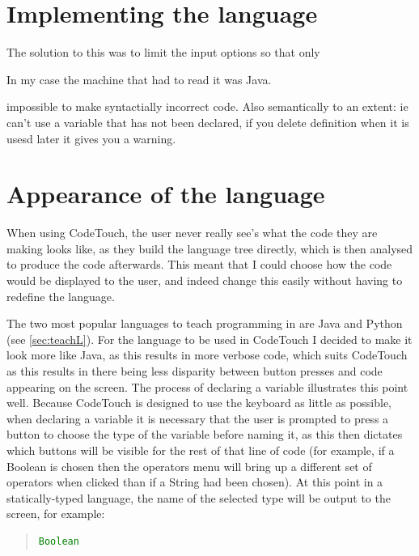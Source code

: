 \documentclass[ %
                    author={Jonathan Rankin},
                supervisor={Dr. David May, Dr. Ian Holyer},
                    degree={MEng},
                     title={CodeTouch},
                  subtitle={A Revolutionary Way To Program Real Code On Touch Screen Devices},
                      type={enterprise},
                      year={2015 } ]{dissertation}
\begin{document}
\begin{enumerate}
\section{Implementing the language}


The solution to this was to limit the input options so that only 

In my case the machine that had to read it was Java.

impossible to make syntactially incorrect code. Also semantically to an extent: ie can't use a variable that has not been declared, if you delete definition when it is usesd later it gives you a warning. 



\section{Appearance of the language}
When using CodeTouch, the user never really see's what the code they are making looks like, as they build the language tree directly, which is then analysed to produce the code afterwards. This meant that I could choose how the code would be displayed to the user, and indeed change this easily without having to redefine the language. 

The two most popular languages to teach programming in are Java and Python (see \ref{sec:teachL}). For the language to be used in CodeTouch I decided to make it look more like Java, as this results in more verbose code, which suits CodeTouch as this results in there being less disparity between button presses and code appearing on the screen. The process of declaring a variable illustrates this point well. Because CodeTouch is designed to use the keyboard as little as possible, when declaring a variable it is necessary that the user is prompted to press a button to choose the type of the variable before naming it, as this then dictates which buttons will be visible for the rest of that line of code (for example, if a Boolean is chosen then the operators menu will bring up a different set of operators when clicked than if a String had been chosen). At this point in a statically-typed language, the name of the selected type will be output to the screen, for example:
 
\begin{quote}
\begin{lstlisting}[caption={Output when Boolean type is selected for variable declaration in Java},label={lst:javaDec},language=Java]
Boolean
\end{lstlisting}
\label{lst:label}
\end{quote}


\end{enumerate}
\end{document}
